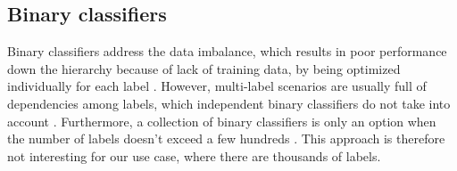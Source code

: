 \subsection{Binary classifiers}

Binary classifiers address the data imbalance, which results in poor performance down the hierarchy because of lack of training data, by being optimized individually for each label \cite{banerjee2019hierarchical}. However, multi-label scenarios are usually full of dependencies among labels, which independent binary classifiers do not take into account \cite{liu2017deep}. Furthermore, a collection of binary classifiers is only an option when the number of labels doesn't exceed a few hundreds \cite{banerjee2019hierarchical}. This approach is therefore not interesting for our use case, where there are thousands of labels.